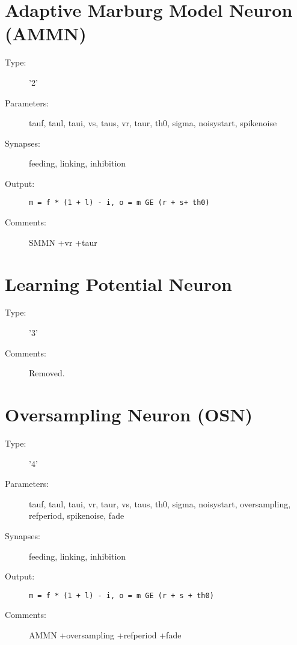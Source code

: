 \documentclass[12pt]{article}
\begin{document}
\section{Adaptive Marburg Model Neuron (AMMN)}
\begin{description}
\item[Type:] '2'

\item[Parameters:] tauf, taul, taui, vs, taus, vr, taur, th0, sigma, noisystart,
              spikenoise

\item[Synapses:] feeding, linking, inhibition

\item[Output:] \texttt{m = f * (1 + l) - i, o = m GE (r + s+ th0)}

\item[Comments:] SMMN +vr +taur
\end{description}



\section{Learning Potential Neuron}
\begin{description}
\item[Type:] '3'
\item[Comments:] Removed.
\end{description}



\section{Oversampling Neuron (OSN)}
\begin{description}
\item[Type:] '4'

\item[Parameters:] tauf, taul, taui, vr, taur, vs, taus, th0, sigma, noisystart, 
              oversampling, refperiod, spikenoise, fade

\item[Synapses:] feeding, linking, inhibition

\item[Output:] \texttt{m = f * (1 + l) - i, o = m GE (r + s + th0)}

\item[Comments:] AMMN +oversampling +refperiod +fade
\end{description}
\end{document}
